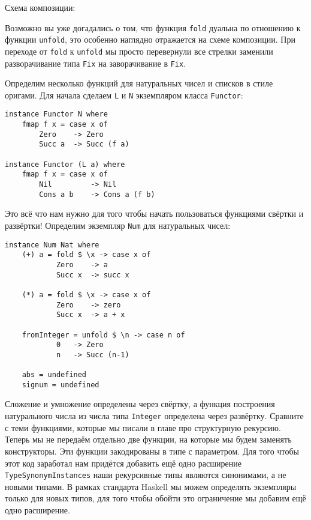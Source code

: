 Схема композиции:

\begin{centering}



\end{centering}

Возможно вы уже догадались о том, что функция \texttt{fold} дуальна по
отношению к функции \texttt{unfold}, это особенно наглядно отражается на
схеме композиции. При переходе от \texttt{fold} к \texttt{unfold} мы
просто перевернули все стрелки заменили разворачивание типа \texttt{Fix}
на заворачивание в \texttt{Fix}.

Определим несколько функций для натуральных чисел и списков в стиле
оригами. Для начала сделаем \texttt{L} и \texttt{N} экземпляром класса
\texttt{Functor}:

\begin{verbatim}
instance Functor N where
    fmap f x = case x of
        Zero    -> Zero
        Succ a  -> Succ (f a)

instance Functor (L a) where
    fmap f x = case x of
        Nil         -> Nil
        Cons a b    -> Cons a (f b)
\end{verbatim}

Это всё что нам нужно для того чтобы начать пользоваться функциями
свёртки и развёртки! Определим экземпляр \texttt{Num} для натуральных
чисел:

\begin{verbatim}
instance Num Nat where
    (+) a = fold $ \x -> case x of
            Zero    -> a
            Succ x  -> succ x

    (*) a = fold $ \x -> case x of
            Zero    -> zero
            Succ x  -> a + x

    fromInteger = unfold $ \n -> case n of
            0   -> Zero
            n   -> Succ (n-1)

    abs = undefined
    signum = undefined
\end{verbatim}

Сложение и умножение определены через свёртку, а функция построения
натурального числа из числа типа \texttt{Integer} определена через
развёртку. Сравните с теми функциями, которые мы писали в главе про
структурную рекурсию. Теперь мы не передаём отдельно две функции, на
которые мы будем заменять конструкторы. Эти функции закодированы в типе
с параметром. Для того чтобы этот код заработал нам придётся добавить
ещё одно расширение \texttt{TypeSynonymInstances} наши рекурсивные типы
являются синонимами, а не новыми типами. В рамках стандарта Haskell мы
можем определять экземпляры только для новых типов, для того чтобы
обойти это ограничение мы добавим ещё одно расширение.

